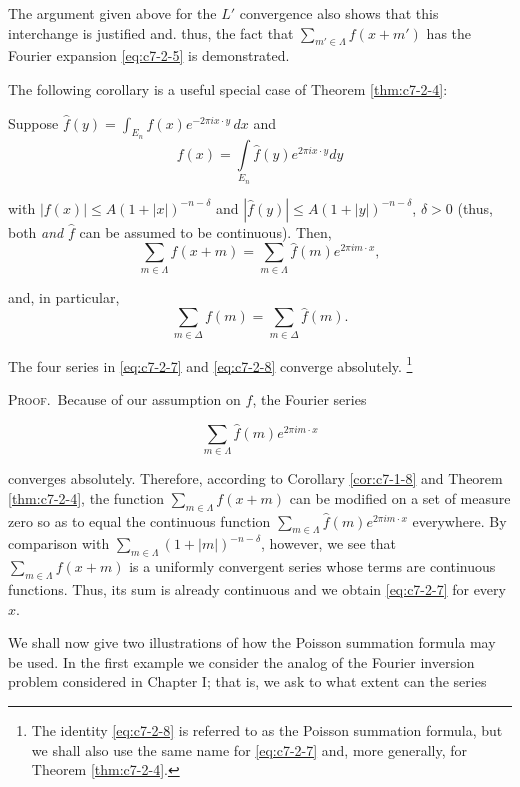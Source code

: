 The argument given above for the $L'$ convergence also shows that this interchange is justified and. thus, the fact that $\sum_{m'\in\Lambda} f(x + m')$ has the Fourier expansion \eqref{eq:c7-2-5} is demonstrated.

The following corollary is a useful special case of Theorem \ref{thm:c7-2-4}:

\begin{corollary}
\label{cor:c7-2-6}
Suppose $\hat{f}(y) = \int_{E_n} f(x) e^{-2\pi i x \cdot y} \, dx$ and
\[
f(x)=\int\limits_{E_{n}}\hat{f}(y)e^{2\pi i x\cdot y}dy
\]

with $|f(x)| \leq A(1 + |x|)^{-n-\delta}$ and $|\hat{f}(y)| \leq A(1 + |y|)^{-n-\delta}$, $\delta > 0$ (thus, both \textit{and} $\hat{f}$ can be assumed to be continuous). Then,
\begin{equation}\label{eq:c7-2-7}
\sum_{m\in\Lambda}f(x+m)=\sum_{m\in\Lambda}\hat{f}(m)e^{2\pi i m\cdot x},
\end{equation}

and, in particular,
\begin{equation}\label{eq:c7-2-8}
\sum_{m\in\Delta}f(m)=\sum_{m\in\Delta}\hat{f}(m).
\end{equation}

\end{corollary}

The four series in \eqref{eq:c7-2-7} and \eqref{eq:c7-2-8} converge absolutely. \footnote{The identity \eqref{eq:c7-2-8} is referred to as the Poisson summation formula, but we shall also use the same name for \eqref{eq:c7-2-7} and, more generally, for Theorem \ref{thm:c7-2-4}.}

\textsc{Proof.}\ Because of our assumption on $f$, the Fourier series

\[
\sum_{m\in\Lambda}\hat{f}(m)e^{2\pi i m\cdot x}
\]

converges absolutely. Therefore, according to Corollary \ref{cor:c7-1-8} and Theorem \ref{thm:c7-2-4}, the function $\sum_{m\in\Lambda} f(x + m)$ can be modified on a set of measure zero so as to equal the continuous function $\sum_{m\in\Lambda} \hat{f}(m)e^{2\pi im\cdot x}$ everywhere. By comparison with $\sum_{m\in\Lambda} (1 + |m|)^{-n-\delta}$, however, we see that $\sum_{m\in\Lambda} f(x + m)$ is a uniformly convergent series whose terms are continuous functions. Thus, its sum is already continuous and we obtain \eqref{eq:c7-2-7} for every $x$.

We shall now give two illustrations of how the Poisson summation formula may be used. In the first example we consider the analog of the Fourier inversion problem considered in Chapter I; that is, we ask to what extent can the series

